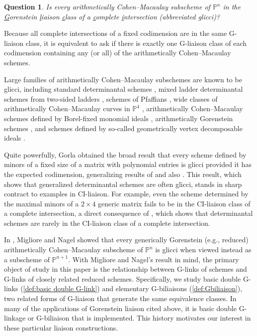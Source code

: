 \documentclass[12pt, reqno]{amsart}
\numberwithin{equation}{section}
\newtheorem{Main Conjecture}[theorem]{Main Conjecture}
\theoremstyle{definition}
\theoremstyle{plain}
\newtheorem{question}{Question}
\newcommand{\PP}{\mathbb{P}}
\begin{document}
\begin{question}\cite[Question 1.6]{KMM+01}\label{quest:ACM==glicci} 
Is every arithmetically Cohen--Macaulay subscheme of $\PP^n$ in the \underline{G}orenstein \underline{l}iaison \underline{c}lass of a \underline{c}omplete \underline{i}ntersection (abbreviated glicci)?
    \end{question}

\noindent Because all complete intersections of a fixed codimension are in the same G-liaison class, it is equivalent to ask if there is exactly one G-liaison class of each codimension containing any (or all) of the arithmetically Cohen--Macaulay schemes.

Large families of arithmetically Cohen--Macaulay subschemes are known to be glicci, including standard determinantal schemes \cite{KMM+01}, mixed ladder determinantal schemes from two-sided ladders \cite{Gor07}, schemes of Pfaffians \cite{DG09}, wide classes of arithmetically Cohen--Macaulay curves in $\PP^4$ \cite{CMR00, CMR01}, arithmetically Cohen--Macaulay schemes defined by Borel-fixed monomial ideals \cite{MN02}, arithmetically Gorenstein schemes \cite{CDH05}, and schemes defined by so-called geometrically vertex decomposable ideals \cite{KR21}.  

Quite powerfully, Gorla \cite{Gor08} obtained the broad result that every scheme defined by minors of a fixed size of a matrix with polynomial entries is glicci provided it has the expected codimension, generalizing results of \cite{KMM+01} and also \cite{Har07}.  This result, which shows that generalized determinantal schemes are often glicci, stands in sharp contract to examples in CI-liaison. 
 For example, even the scheme determined by the maximal minors of a $2 \times 4$ generic matrix fails to be in the CI-liaison class of a complete intersection, a direct consequence of \cite[Corollary 5.13]{HU87}, which shows that determinantal schemes are rarely in the CI-liaison class of a complete intersection.  

In \cite[Theorem 2.3]{MN13}, Migliore and Nagel showed that every generically Gorenstein (e.g., reduced) arithmetically Cohen--Macaulay subscheme of $\PP^n$ is glicci when viewed instead as a subscheme of $\PP^{n+1}$.  With Migliore and Nagel's result in mind, the primary object of study in this paper is the relationship between G-links of schemes and G-links of closely related reduced schemes.  Specifically, we study basic double G-links (\cref{def:basic double G-link}) and elementary G-biliaisons (\cref{def:Gbiliaison}), two related forms of G-liaison that generate the same equivalence classes. In many of the applications of Gorenstein liaison cited above, it is basic double G-linkage or G-biliaison that is implemented.  This history motivates our interest in these particular liaison constructions.
\end{document}
